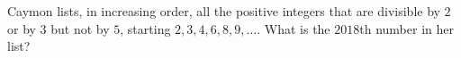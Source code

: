 Caymon lists, in increasing order, all the positive integers that are divisible by $2$ or by $3$ but not by $5$, starting $2,3,4,6,8,9,\dots$. What is the $2018$th number in her list?
